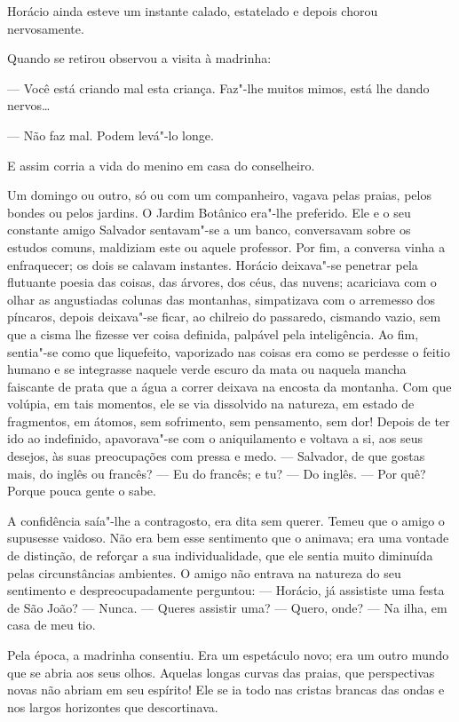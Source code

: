 Horácio ainda esteve um instante calado, estatelado e depois chorou
nervosamente.

Quando se retirou observou a visita à madrinha:

--- Você está criando mal esta criança. Faz"-lhe muitos mimos, está lhe
dando nervos\ldots{}

--- Não faz mal. Podem levá"-lo longe.

E assim corria a vida do menino em casa do conselheiro.

Um domingo ou outro, só ou com um companheiro, vagava pelas praias,
pelos bondes ou pelos jardins. O Jardim Botânico era"-lhe preferido. Ele
e o seu constante amigo Salvador sentavam"-se a um banco, conversavam
sobre os estudos comuns, maldiziam este ou aquele professor. Por fim, a
conversa vinha a enfraquecer; os dois se calavam instantes. Horácio
deixava"-se penetrar pela flutuante poesia das coisas, das árvores, dos
céus, das nuvens; acariciava com o olhar as angustiadas colunas das
montanhas, simpatizava com o arremesso dos píncaros, depois deixava"-se
ficar, ao chilreio do passaredo, cismando vazio, sem que a cisma lhe
fizesse ver coisa definida, palpável pela inteligência. Ao fim,
sentia"-se como que liquefeito, vaporizado nas coisas era como se
perdesse o feitio humano e se integrasse naquele verde escuro da mata ou
naquela mancha faiscante de prata que a água a correr deixava na encosta
da montanha. Com que volúpia, em tais momentos, ele se via dissolvido na
natureza, em estado de fragmentos, em átomos, sem sofrimento, sem
pensamento, sem dor! Depois de ter ido ao indefinido, apavorava"-se com o
aniquilamento e voltava a si, aos seus desejos, às suas preocupações com
pressa e medo. --- Salvador, de que gostas mais, do inglês ou francês? ---
Eu do francês; e tu? --- Do inglês. --- Por quê? Porque pouca gente o
sabe.

A confidência saía"-lhe a contragosto, era dita sem querer. Temeu que o
amigo o supusesse vaidoso. Não era bem esse sentimento que o animava;
era uma vontade de distinção, de reforçar a sua individualidade, que ele
sentia muito diminuída pelas circunstâncias ambientes. O amigo não
entrava na natureza do seu sentimento e despreocupadamente perguntou: ---
Horácio, já assististe uma festa de São João? --- Nunca. --- Queres
assistir uma? --- Quero, onde? --- Na ilha, em casa de meu tio.

Pela época, a madrinha consentiu. Era um espetáculo novo; era um outro
mundo que se abria aos seus olhos. Aquelas longas curvas das praias, que
perspectivas novas não abriam em seu espírito! Ele se ia todo nas
cristas brancas das ondas e nos largos horizontes que descortinava.

